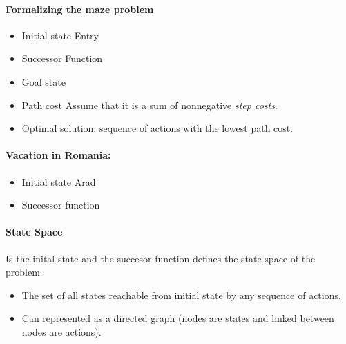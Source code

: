 \documentclass{article}
\begin{document}
\paragraph{Formalizing the maze problem}

\begin{itemize}
  \item Initial state 
    \subitem Entry 
  \item Successor Function
  \item Goal state 
  \item Path cost
    \subitem Assume that it is a sum of nonnegative \textit{step costs}.
  \item Optimal solution: sequence of actions with the lowest path cost.
\end{itemize}

\paragraph{Vacation in Romania:}

\begin{itemize}
  \item Initial state
    \subitem Arad
  \item Successor function
    \subitem 
\end{itemize}

\paragraph{State Space}
Is the inital state and the succesor function defines the state space of the
problem. 
\begin{itemize}
  \item The set of all states reachable from initial state by any sequence of
    actions.
  \item Can represented as a directed graph (nodes are states and linked between
    nodes are actions).
\end{itemize}
\end{document}
